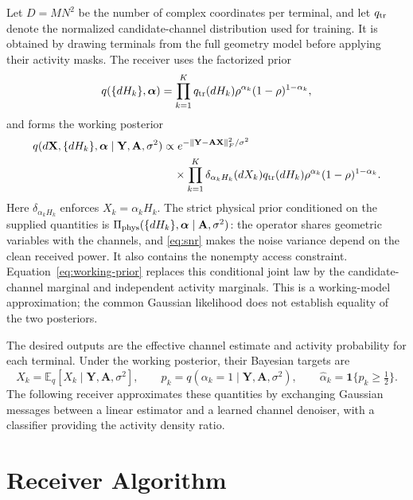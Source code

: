 \documentclass[10pt,a4paper]{article}
\newcommand{\E}{\mathbb{E}}
\newcommand{\norm}[1]{\left\lVert#1\right\rVert}
\begin{document}
Let $D=MN^2$ be the number of complex coordinates per terminal, and let
$q_{\rm tr}$ denote the normalized candidate-channel distribution used
for training. It is obtained by drawing terminals from the full geometry
model before applying their activity masks. The receiver uses the
factorized prior
\begin{equation}
 q(\{dH_k\},\bm\alpha)=
 \prod_{k=1}^{K}q_{\rm tr}(dH_k)
       \rho^{\alpha_k}(1-\rho)^{1-\alpha_k},
 \label{eq:working-prior}
\end{equation}
and forms the working posterior
\begin{equation}
 \begin{aligned}
 q(d\mathbf{X},\{dH_k\},\bm\alpha\mid\mathbf{Y},\mathbf{A},\sigma^2)
 &\propto e^{-\norm{\mathbf{Y}-\mathbf{A}\mathbf{X}}_F^2/\sigma^2}\\
 &\quad\times\prod_{k=1}^{K}\delta_{\alpha_kH_k}(dX_k)
       q_{\rm tr}(dH_k)\rho^{\alpha_k}(1-\rho)^{1-\alpha_k}.
 \end{aligned}
 \label{eq:working-posterior}
\end{equation}
Here $\delta_{\alpha_kH_k}$ enforces $X_k=\alpha_kH_k$. The strict
physical prior conditioned on the supplied quantities is
$\Pi_{\rm phys}(\{dH_k\},\bm\alpha\mid\mathbf A,\sigma^2)$:
the operator shares geometric variables with the channels, and
\eqref{eq:snr} makes the noise variance depend on the clean received
power. It also contains the nonempty access constraint.
Equation~\eqref{eq:working-prior} replaces this conditional joint law by
the candidate-channel marginal and independent activity marginals.
This is a working-model approximation; the common Gaussian likelihood
does not establish equality of the two posteriors.

The desired outputs are the effective channel estimate and activity
probability for each terminal. Under the working posterior, their Bayesian
targets are
\begin{equation}
 \widehat X_k=\E_q[X_k\mid\mathbf{Y},\mathbf{A},\sigma^2],\qquad
 p_k=q(\alpha_k=1\mid\mathbf{Y},\mathbf{A},\sigma^2),\qquad
 \widehat\alpha_k=\mathbf{1}\{p_k\geq\tfrac12\}.
 \label{eq:targets}
\end{equation}
The following receiver approximates these quantities by exchanging
Gaussian messages between a linear estimator and a learned channel
denoiser, with a classifier providing the activity density ratio.

\section{Receiver Algorithm}
\label{sec:algorithm}
\end{document}
